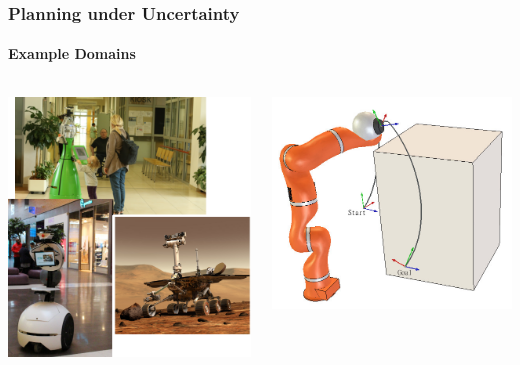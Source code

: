 \begin{frame}
	\frametitle{Planning under Uncertainty}
	\framesubtitle{Example Domains}
	
	\begin{columns}[t]
		\begin{column}{.3\textwidth}
			\centering 
			\begin{overlayarea}{\linewidth}{4.75cm}
				\includegraphics[width=\columnwidth]{figures/path-planning}
			\end{overlayarea}
		\end{column}
		\begin{column}{.25\textwidth}
			\centering
			\begin{overlayarea}{\linewidth}{4.75cm}
				\centering
				\vspace{-18pt}
				\includegraphics[width=0.75\columnwidth]{figures/motion-planning}\\

\end{overlayarea}
\end{column}
\end{columns}
\end{frame}
